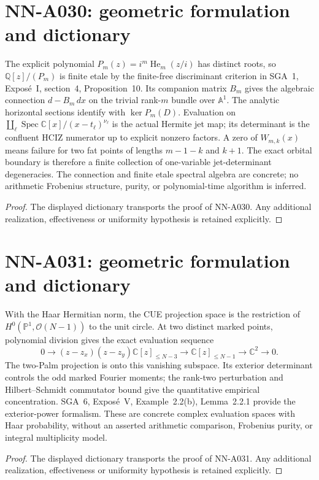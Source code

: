 \section{NN-A030: geometric formulation and dictionary}
\begin{geometricstatement}[NN-A030]
The explicit polynomial $P_m(z)=i^m\operatorname{He}_m(z/i)$ has distinct roots, so $\mathbb Q[z]/(P_m)$ is finite etale by the finite-free discriminant criterion in SGA~1, Expos\'e~I, section~4, Proposition~10. Its companion matrix $B_m$ gives the algebraic connection $d-B_m\,dx$ on the trivial rank-$m$ bundle over $\mathbb A^1$. The analytic horizontal sections identify with $\ker P_m(D)$. Evaluation on $\coprod_\ell\operatorname{Spec}\mathbb C[x]/(x-t_\ell)^{\nu_\ell}$ is the actual Hermite jet map; its determinant is the confluent HCIZ numerator up to explicit nonzero factors. A zero of $W_{m,k}(x)$ means failure for two fat points of lengths $m-1-k$ and $k+1$. The exact orbital boundary is therefore a finite collection of one-variable jet-determinant degeneracies. The connection and finite etale spectral algebra are concrete; no arithmetic Frobenius structure, purity, or polynomial-time algorithm is inferred.
\end{geometricstatement}
\begin{proof} The displayed dictionary transports the proof of NN-A030. Any additional realization, effectiveness or uniformity hypothesis is retained explicitly.\end{proof}


\section{NN-A031: geometric formulation and dictionary}
\begin{geometricstatement}[NN-A031]
With the Haar Hermitian norm, the CUE projection space is the restriction of $H^0(\mathbb P^1,\mathcal O(N-1))$ to the unit circle. At two distinct marked points, polynomial division gives the exact evaluation sequence \[0\to(z-z_x)(z-z_y)\mathbb C[z]_{\le N-3}\to\mathbb C[z]_{\le N-1}\to\mathbb C^2\to0.\] The two-Palm projection is onto this vanishing subspace. Its exterior determinant controls the odd marked Fourier moments; the rank-two perturbation and Hilbert--Schmidt commutator bound give the quantitative empirical concentration. SGA~6, Expos\'e~V, Example~2.2(b), Lemma~2.2.1 provide the exterior-power formalism. These are concrete complex evaluation spaces with Haar probability, without an asserted arithmetic comparison, Frobenius purity, or integral multiplicity model.
\end{geometricstatement}
\begin{proof} The displayed dictionary transports the proof of NN-A031. Any additional realization, effectiveness or uniformity hypothesis is retained explicitly.\end{proof}


